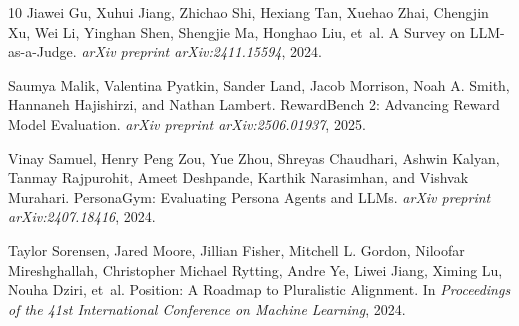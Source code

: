 \begin{thebibliography}{10}
Jiawei Gu, Xuhui Jiang, Zhichao Shi, Hexiang Tan, Xuehao Zhai, Chengjin Xu, Wei Li, Yinghan Shen, Shengjie Ma, Honghao Liu, et~al.
\newblock A Survey on LLM-as-a-Judge.
\newblock \emph{arXiv preprint arXiv:2411.15594}, 2024.

Saumya Malik, Valentina Pyatkin, Sander Land, Jacob Morrison, Noah A. Smith, Hannaneh Hajishirzi, and Nathan Lambert.
\newblock RewardBench 2: Advancing Reward Model Evaluation.
\newblock \emph{arXiv preprint arXiv:2506.01937}, 2025.

Vinay Samuel, Henry Peng Zou, Yue Zhou, Shreyas Chaudhari, Ashwin Kalyan, Tanmay Rajpurohit, Ameet Deshpande, Karthik Narasimhan, and Vishvak Murahari.
\newblock PersonaGym: Evaluating Persona Agents and LLMs.
\newblock \emph{arXiv preprint arXiv:2407.18416}, 2024.

Taylor Sorensen, Jared Moore, Jillian Fisher, Mitchell L. Gordon, Niloofar Mireshghallah, Christopher Michael Rytting, Andre Ye, Liwei Jiang, Ximing Lu, Nouha Dziri, et~al.
\newblock Position: A Roadmap to Pluralistic Alignment.
\newblock In \emph{Proceedings of the 41st International Conference on Machine Learning}, 2024.

\end{thebibliography}
